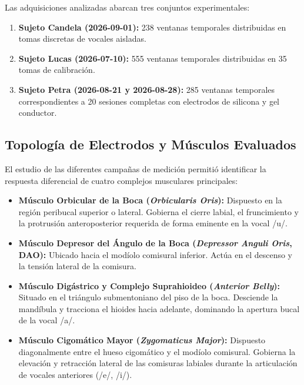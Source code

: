 \documentclass[11pt,a4paper,openany]{book}
\theoremstyle{definition}
\begin{document}
Las adquisiciones analizadas abarcan tres conjuntos experimentales:
\begin{enumerate}
    \item \textbf{Sujeto Candela (2026-09-01):} 238 ventanas temporales distribuidas en tomas discretas de vocales aisladas.
    \item \textbf{Sujeto Lucas (2026-07-10):} 555 ventanas temporales distribuidas en 35 tomas de calibración.
    \item \textbf{Sujeto Petra (2026-08-21 y 2026-08-28):} 285 ventanas temporales correspondientes a 20 sesiones completas con electrodos de silicona y gel conductor.
\end{enumerate}

\subsection{Topología de Electrodos y Músculos Evaluados}
\label{subsec:topologia_muscular}

El estudio de las diferentes campañas de medición permitió identificar la respuesta diferencial de cuatro complejos musculares principales:
\begin{itemize}
    \item \textbf{Músculo Orbicular de la Boca (\textit{Orbicularis Oris}):} Dispuesto en la región peribucal superior o lateral. Gobierna el cierre labial, el fruncimiento y la protrusión anteroposterior requerida de forma eminente en la vocal /u/.
    \item \textbf{Músculo Depresor del Ángulo de la Boca (\textit{Depressor Anguli Oris}, DAO):} Ubicado hacia el modíolo comisural inferior. Actúa en el descenso y la tensión lateral de la comisura.
    \item \textbf{Músculo Digástrico y Complejo Suprahioideo (\textit{Anterior Belly}):} Situado en el triángulo submentoniano del piso de la boca. Desciende la mandíbula y tracciona el hioides hacia adelante, dominando la apertura bucal de la vocal /a/.
    \item \textbf{Músculo Cigomático Mayor (\textit{Zygomaticus Major}):} Dispuesto diagonalmente entre el hueso cigomático y el modíolo comisural. Gobierna la elevación y retracción lateral de las comisuras labiales durante la articulación de vocales anteriores (/e/, /i/).
\end{itemize}
\end{document}
